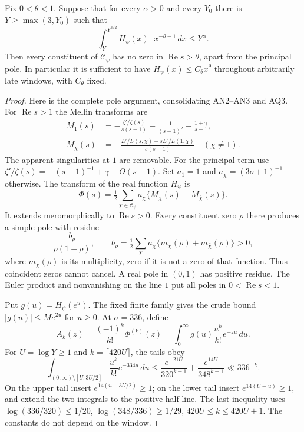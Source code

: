 \begin{theorem}
\label{claim:CMP4}
Fix $0<\theta<1$.  Suppose that for every $\alpha>0$ and every
$Y_0$ there is $Y\ge\max(3,Y_0)$ such that
\[
       \int_Y^{Y^{3/2}}H_\psi(x)_+x^{-\theta-1}\,dx\le Y^\alpha.
 \tag{CMP.15}
\]
Then every constituent of $\mathcal C_\psi$ has no zero in
$\operatorname{Re}s>\theta$, apart from the principal pole.
In particular it is sufficient to have
$H_\psi(x)\le C_\theta x^\theta$ throughout arbitrarily late
windows, with $C_\theta$ fixed.
\end{theorem}
\begin{proof}
Here is the complete pole argument, consolidating AN2--AN3 and AQ3.
For $\operatorname{Re}s>1$ the Mellin transforms are
\begin{align*}
 M_1(s)&=-\frac{\zeta'/\zeta(s)}{s(s-1)}
             -\frac1{(s-1)^2}+\frac{1+\gamma}{s-1},\\
 M_\chi(s)&=-\frac{L'/L(s,\chi)-sL'/L(1,\chi)}{s(s-1)}
                                                    \quad(\chi\ne1).
\end{align*}
The apparent singularities at $1$ are removable.  For the principal
term use $\zeta'/\zeta(s)=-(s-1)^{-1}+\gamma+O(s-1)$.
Set $a_1=1$ and $a_\chi=(3o+1)^{-1}$ otherwise.  The transform
of the real function $H_\psi$ is
\[
 \Phi(s)=\tfrac12\sum_{\chi\in\mathcal C_\psi}
                    a_\chi\{M_\chi(s)+M_{\bar\chi}(s)\}.
\]
It extends meromorphically to $\operatorname{Re}s>0$.  Every
constituent zero $\rho$ there produces a simple pole with residue
\[
 \frac{b_\rho}{\rho(1-\rho)},\qquad
 b_\rho=\tfrac12\sum_\chi a_\chi
                    \{m_\chi(\rho)+m_{\bar\chi}(\rho)\}>0,
                                                               \tag{CMP.16}
\]
where $m_\chi(\rho)$ is its multiplicity, zero if it is not a
zero of that function.  Thus coincident zeros cannot cancel.  A
real pole in $(0,1)$ has positive residue.  The Euler product and
nonvanishing on the line $1$ put all poles in $0<\operatorname{Re}s<1$.

Put $g(u)=H_\psi(e^u)$.  The fixed finite family gives the crude
bound $|g(u)|\le M e^{2u}$ for $u\ge0$.  At
$\sigma=336$, define
\[
 A_k(z)=\frac{(-1)^k}{k!}\Phi^{(k)}(z)
       =\int_0^\infty g(u)\frac{u^k}{k!}e^{-zu}\,du.
\]
For $U=\log Y\ge1$ and $k=\lceil420U\rceil$, the tails obey
\[
 \int_{(0,\infty)\setminus[U,3U/2]}
          \frac{u^k}{k!}e^{-334u}\,du
 \le\frac{e^{-21U}}{320^{k+1}}+
                         \frac{e^{14U}}{348^{k+1}}
 \ll336^{-k}.                                      \tag{CMP.17}
\]
On the upper tail insert $e^{14(u-3U/2)}\ge1$; on the lower
tail insert $e^{14(U-u)}\ge1$, and extend the two integrals to
the positive half-line.  The last inequality uses
$\log(336/320)\le1/20$, $\log(348/336)\ge1/29$,
$420U\le k\le420U+1$.  The constants do not depend on the window.


\end{proof}
